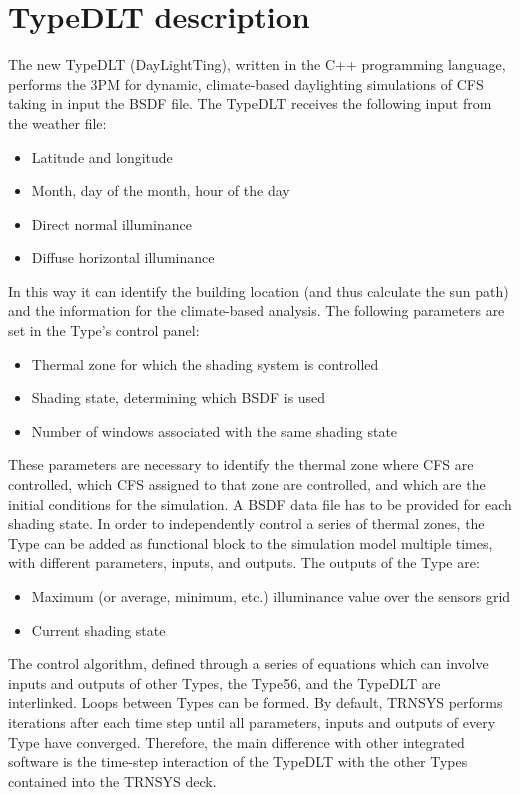 \chapter{TypeDLT description}

The new TypeDLT (DayLightTing), written in the C++ programming language, performs the 3PM for dynamic, climate-based daylighting simulations of CFS taking in input the BSDF file.
The TypeDLT receives the following input from the weather file:
\begin{itemize}
\renewcommand{\labelitemi}{\tiny$\blacksquare$}
\item Latitude and longitude
\item Month, day of the month, hour of the day
\item Direct normal illuminance
\item Diffuse horizontal illuminance
\end{itemize}
In this way it can identify the building location (and thus calculate the sun path) and the information for the climate-based analysis. The following parameters are set in the Type's control panel:
\begin{itemize}
\renewcommand{\labelitemi}{\tiny$\blacksquare$}
\item Thermal zone for which the shading system is controlled
\item Shading state, determining which BSDF is used
\item Number of windows associated with the same shading state
\end{itemize}
These parameters are necessary to identify the thermal zone where CFS are controlled, which CFS assigned to that zone are controlled, and which are the initial conditions for the simulation. A BSDF data file has to be provided for each shading state. In order to independently control a series of thermal zones, the Type can be added as functional block to the simulation model multiple times, with different parameters, inputs, and outputs.
The outputs of the Type are:
\begin{itemize}
\renewcommand{\labelitemi}{\tiny$\blacksquare$}
\item Maximum (or average, minimum, etc.) illuminance value over the sensors grid
\item Current shading state
\end{itemize}
The control algorithm, defined through a series of equations which can involve inputs and outputs of other Types, the Type56, and the TypeDLT are interlinked. Loops between Types can be formed. By default, TRNSYS performs iterations after each time step until all parameters, inputs and outputs of every Type have converged. Therefore, the main difference with other integrated software is the time-step interaction of the TypeDLT with the other Types contained into the TRNSYS deck. \\
